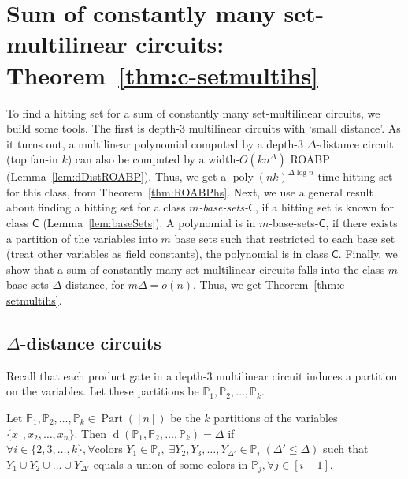 \documentclass[final,oneeqnum, onethmnum, onefignum]{siamltex1213}
\renewcommand{\P}{\mathbb P}
\newcommand{\di}{\Delta} %
\newcommand{\lis}[3]{{#1}_1 #2 {#1}_2 #2\dots #2 {#1}_{#3}}
\DeclareMathOperator{\poly}{poly}
\DeclareMathOperator{\Part}{Part}
\DeclareMathOperator{\dist}{d}
\begin{document}
\section{Sum of constantly many set-multilinear circuits: Theorem~\ref{thm:c-setmultihs}}
\label{sec:sumOfSetMulti}
To find a hitting set for a sum of constantly many set-multilinear circuits, we 
build some tools. The first is depth-3 multilinear circuits with `small distance'.
As it turns out, a multilinear polynomial computed by a depth-$3$ $\di$-distance
circuit (top fan-in $k$) can also be computed by a width-$O(kn^{\di})$ ROABP (Lemma~\ref{lem:dDistROABP}).
Thus, we get a $\poly(nk)^{\di \log n}$-time hitting set for this class,
 from Theorem~\ref{thm:ROABPhs}.
Next, we use a general result about finding a hitting set for a class
{\em $m$-base-sets-$\mathsf{C}$}, 
if a hitting set is known for class $\mathsf{C}$ (Lemma~\ref{lem:baseSets}).
A polynomial is in $m$-base-sets-$\mathsf{C}$,
if there exists a partition of the variables into $m$ base sets
such that restricted to each base set (treat other variables as field constants), 
the polynomial is in class $\mathsf{C}$.
Finally, we show that a sum of constantly many set-multilinear circuits 
falls into the class $m$-base-sets-$\di$-distance, for $m \di = o(n)$.
Thus, we get Theorem~\ref{thm:c-setmultihs}.

\subsection{$\di$-distance circuits}\label{subsec:deltaDistance}

Recall that each product gate in a depth-$3$ multilinear circuit 
induces a partition on the variables. Let these partitions be $ \lis{\P}{,}{k} $.

\begin{definition}%
\label{def:distance}
Let $\P_1, \P_2, \dots, \P_k \in \Part ([n])$ be the $k$ partitions of the variables $\{x_1, x_2, \dots, x_n\}$. Then $\dist(\P_1, \P_2, \dots, \P_k) = \di$ if 
 $ \forall i \in \{2,3,\dots , k\}, \forall\text{colors } Y_1 \in \P_i, \; \exists Y_2, Y_3, \dots, Y_{\di'} \in \P_i \; (\di' \le \di)$ such that $\lis{Y}{\cup}{\di'}$ equals a union of some colors in $ \P_j, \forall j\in [i-1]$.
\end{definition}
\end{document}
